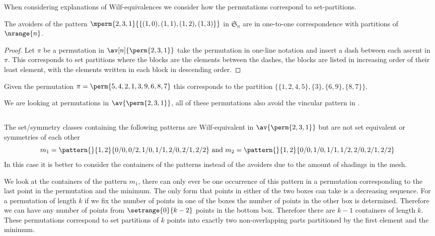 When considering explanations of Wilf-equivalences we consider how the
permutations correspond to set-partitions.

\begin{note}
    \label{not:setequiv}
    The avoiders of the pattern \(\mperm{2,3,1}{\{(1,0),(1,1),(1,2),(1,3)\}}\)
    in \(\mathfrak{S}_n\) are in one-to-one correspondence with partitions of
    \(\nrange{n}\). \cite{DBLP:journals/ejc/Claesson01}
\end{note}
\begin{proof}
    Let \(\pi\) be a permutation in \(\av[n]{\perm{2,3,1}}\) take the permutation
    in one-line notation and insert a dash between each ascent in \(\pi\). This
    corresponds to set partitions where the blocks are the elements between the
    dashes, the blocks are listed in increasing order of their least element,
    with the elements written in each block in descending order.
\end{proof}

\begin{example}
    Given the permutation \(\pi = \perm{5,4,2,1,3,9,6,8,7}\) this corresponds to the
    partition \(\{\{1,2,4,5\},\{3\},\{6,9\},\{8,7\}\}\).
\end{example}

We are looking at permutations in \(\av{\perm{2,3,1}}\), all of these permutations
also avoid the vincular pattern in .

\subsection{}
The set/symmetry classes containing the following patterns are
Wilf-equivalent in \(\av{\perm{2,3,1}}\) but are not set equivalent or
symmetries of each other
\begin{equation*}
    m_1 = \pattern{}{1,2}{0/0,0/2,
                    1/0,1/1,
                    2/0,2/1,2/2}
    \text{ and }
    m_2 = \pattern{}{1,2}{0/0,
                    1/0,1/1,1/2,
                    2/0,2/1,2/2}
\end{equation*}
In this case it is better to consider the containers of the patterns
instead of the avoiders due to the amount of shadings in the mesh.

We look at the containers of the pattern \(m_1\), there can only ever
be one occurrence of this pattern in a permutation corresponding to
the last point in the permutation and the minimum. The only form that
points in either of the two boxes can take is a decreasing sequence.
For a permutation of length \(k\) if we fix the number of points in
one of the boxes the number of points in the other box is determined.
Therefore we can have any number of points from \(\setrange{0}{k-2}\)
points in the bottom box. Therefore there are \(k-1\) containers of
length \(k\). These permutations correspond to set partitions of \(k\)
points into exactly two non-overlapping parts partitioned by the first
element and the minimum.

